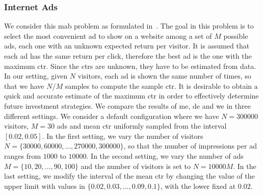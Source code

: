 \subsubsection{Internet Ads}
We consider this \gls{mab} problem as formulated in~\cite{van2013estimating}.
The goal in this problem is to select the most convenient ad to show on a website among a set of $M$ possible ads, each one with an unknown expected return per visitor. 
It is assumed that each ad has the same return per click, therefore the best ad is the one with the maximum \gls{ctr}.
Since the \glspl{ctr} are unknown, they have to be estimated from data.
In our setting, given $N$ visitors, each ad is shown the same number of times, so that we have $N/M$ samples to compute the sample \gls{ctr}.
It is desirable to obtain a quick and accurate estimate of the maximum \gls{ctr} in order to effectively determine future investment strategies.
We compare the results of \gls{me}, \gls{de} and \gls{we} in three different settings. 
We consider a default configuration where we have $N=300000$ visitors, $M = 30$ ads and mean \gls{ctr} uniformly sampled from the interval $[0.02,0.05]$.
In the first setting, we vary the number of visitors $N = \lbrace 30000, 60000, ..., 270000, 300000 \rbrace$, so that the number of impressions per ad ranges from $1000$ to $10000$.
In the second setting, we vary the number of ads $M = \lbrace 10, 20, ..., 90, 100 \rbrace$ and the number of visitors is set to $N=10000M$.
In the last setting, we modify the interval of the mean \gls{ctr} by changing the value of the upper limit with values in $\lbrace 0.02, 0.03, ..., 0.09, 0.1 \rbrace$, with the lower fixed at $0.02$.

